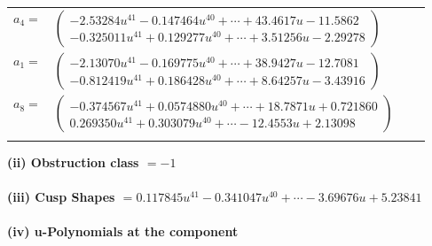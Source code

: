 \documentclass[1p]{elsarticle_modified}
\theoremstyle{definition}
\begin{document}
\begin{tabular}{m{7pt} m{180pt} m{7pt} m{180pt} }
\flushright $a_{4}=$&$\begin{pmatrix}-2.53284 u^{41}-0.147464 u^{40}+\cdots+43.4617 u-11.5862\\-0.325011 u^{41}+0.129277 u^{40}+\cdots+3.51256 u-2.29278\end{pmatrix}$ \\
\flushright $a_{1}=$&$\begin{pmatrix}-2.13070 u^{41}-0.169775 u^{40}+\cdots+38.9427 u-12.7081\\-0.812419 u^{41}+0.186428 u^{40}+\cdots+8.64257 u-3.43916\end{pmatrix}$ \\
\flushright $a_{8}=$&$\begin{pmatrix}-0.374567 u^{41}+0.0574880 u^{40}+\cdots+18.7871 u+0.721860\\0.269350 u^{41}+0.303079 u^{40}+\cdots-12.4553 u+2.13098\end{pmatrix}$\\&\end{tabular}
\flushleft \textbf{(ii) Obstruction class $= -1$}\\~\\
\flushleft \textbf{(iii) Cusp Shapes $= 0.117845 u^{41}-0.341047 u^{40}+\cdots-3.69676 u+5.23841$}\\~\\
\newpage\renewcommand{\arraystretch}{1}
\flushleft \textbf{(iv) u-Polynomials at the component}\newline \\
\end{document}

